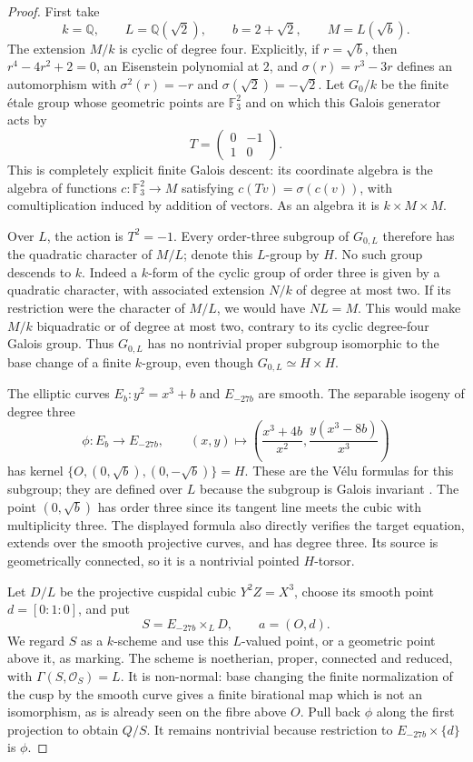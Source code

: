 \begin{proof}
First take
\[
k=\mathbb Q,\qquad L=\mathbb Q(\sqrt2),\qquad
b=2+\sqrt2,\qquad M=L(\sqrt b).
\]
The extension $M/k$ is cyclic of degree four.  Explicitly, if
$r=\sqrt b$, then $r^4-4r^2+2=0$, an Eisenstein polynomial at $2$,
and $\sigma(r)=r^3-3r$ defines an automorphism with
$\sigma^2(r)=-r$ and $\sigma(\sqrt2)=-\sqrt2$.
Let $G_0/k$ be the finite \'etale group whose geometric points are
$\mathbb F_3^2$ and on which this Galois generator acts by
\[
T=\begin{pmatrix}0&-1\\1&0\end{pmatrix}.
\]
This is completely explicit finite Galois descent: its coordinate
algebra is the algebra of functions $c\colon\mathbb F_3^2\to M$
satisfying $c(Tv)=\sigma(c(v))$, with comultiplication induced by
addition of vectors.  As an algebra it is $k\times M\times M$.

Over $L$, the action is $T^2=-1$.  Every order-three subgroup of
$G_{0,L}$ therefore has the quadratic character of $M/L$; denote
this $L$-group by $H$.  No such group descends to $k$.  Indeed a
$k$-form of the cyclic group of order three is given by a quadratic
character, with associated extension $N/k$ of degree at most two.
If its restriction were the character of $M/L$, we would have
$NL=M$.  This would make $M/k$ biquadratic or of degree at most two,
contrary to its cyclic degree-four Galois group.  Thus $G_{0,L}$
has no nontrivial proper subgroup isomorphic to the base change of
a finite $k$-group, even though $G_{0,L}\simeq H\times H$.

The elliptic curves
$E_b\colon y^2=x^3+b$ and $E_{-27b}$ are smooth.  The separable
isogeny of degree three
\[
\phi\colon E_b\longrightarrow E_{-27b},\qquad
(x,y)\longmapsto
\left(\frac{x^3+4b}{x^2},\frac{y(x^3-8b)}{x^3}\right)
\]
has kernel $\{O,(0,\sqrt b),(0,-\sqrt b)\}=H$.  These are the
V\'elu formulas for this subgroup; they are defined over $L$ because
the subgroup is Galois invariant
\cite[\S3, equations (8)--(11), Remark~3]{C_Velu1971}.
The point $(0,\sqrt b)$ has order three since its tangent line
meets the cubic with multiplicity three.  The displayed formula also
directly verifies the target equation, extends over the smooth
projective curves, and has degree three.  Its source is geometrically
connected, so it is a nontrivial pointed $H$-torsor.

Let $D/L$ be the projective cuspidal cubic $Y^2Z=X^3$, choose its
smooth point $d=[0:1:0]$, and put
\[
S=E_{-27b}\times_L D,
\qquad a=(O,d).
\]
We regard $S$ as a $k$-scheme and use this $L$-valued point, or a
geometric point above it, as marking.  The scheme is noetherian,
proper, connected and reduced, with
$\Gamma(S,\mathcal O_S)=L$.  It is non-normal: base changing the
finite normalization of the cusp by the smooth curve gives a finite
birational map which is not an isomorphism, as is already seen on
the fibre above $O$.  Pull back $\phi$ along the first projection
to obtain $Q/S$.  It remains nontrivial because restriction to
$E_{-27b}\times\{d\}$ is $\phi$.


\end{proof}
